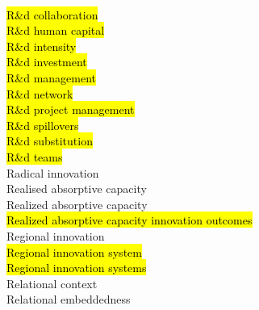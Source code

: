 \documentclass[a4paper]{article}
\begin{document}
\begin{multicols*}{2}
\begin{footnotesize}
\\ \hl{R\&d collaboration} \\ \hl{R\&d human capital} \\ \hl{R\&d intensity} \\ \hl{R\&d investment} \\ \hl{R\&d management} \\ \hl{R\&d network} \\ \hl{R\&d project management} \\ \hl{R\&d spillovers} \\ \hl{R\&d substitution} \\ \hl{R\&d teams} \\ Radical innovation \\ Realised absorptive capacity \\ Realized absorptive capacity \\ \hl{Realized absorptive capacity innovation outcomes} \\ Regional innovation \\ \hl{Regional innovation system} \\ \hl{Regional innovation systems} \\ Relational context \\ Relational embeddedness 
\end{footnotesize}
\end{multicols*}
\end{document}
